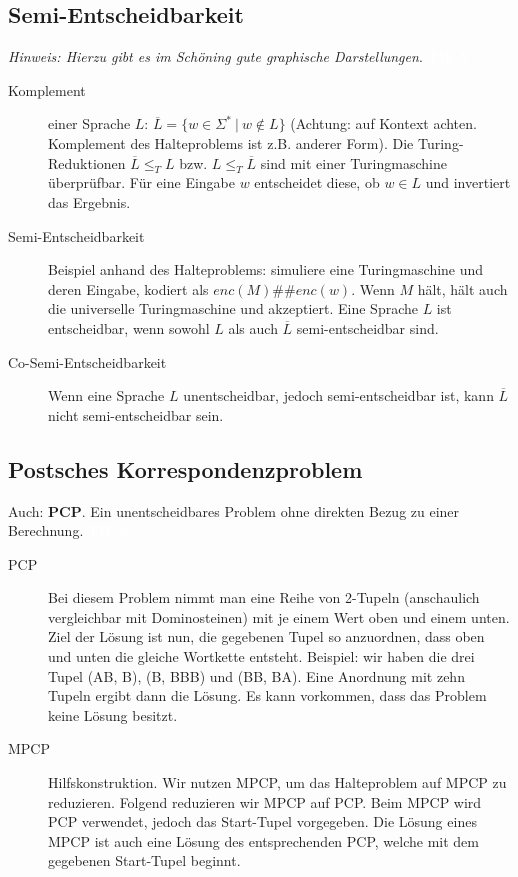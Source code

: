 \documentclass[a4paper,10pt]{article}
\newcommand{\vl}[1]{\colorbox{vl}{\textcolor{white}{\small\textbf{#1}}}}
\newcommand{\f}[1]{\textbf{#1}}
\begin{document}
    \subsection{Semi-Entscheidbarkeit}
    \textit{Hinweis: Hierzu gibt es im Schöning gute graphische Darstellungen}. \vl{TIL 5}
    \begin{description}
        \item[Komplement] einer Sprache $L$: $\overline{L} = \{w \in \Sigma^* ~|~ w \notin L \}$ (Achtung: auf Kontext achten. Komplement des Halteproblems ist z.B. anderer Form). Die Turing-Reduktionen $\overline{L} \leq_T L$ bzw. $L \leq_T \overline{L}$ sind mit einer Turingmaschine überprüfbar. Für eine Eingabe $w$ entscheidet diese, ob $w \in L$ und invertiert das Ergebnis.
        \item[Semi-Entscheidbarkeit] Beispiel anhand des Halteproblems: simuliere eine Turingmaschine und deren Eingabe, kodiert als $enc(M)\#\#enc(w)$. Wenn $M$ hält, hält auch die universelle Turingmaschine und akzeptiert. Eine Sprache $L$ ist entscheidbar, wenn sowohl $L$ als auch $\overline{L}$ semi-entscheidbar sind.
        \item[Co-Semi-Entscheidbarkeit] Wenn eine Sprache $L$ unentscheidbar, jedoch semi-entscheidbar ist, kann $\overline{L}$ nicht semi-entscheidbar sein.
    \end{description}


    \newpage
    \subsection{Postsches Korrespondenzproblem}
    Auch: \f{PCP}. Ein unentscheidbares Problem ohne direkten Bezug zu einer Berechnung. \vl{TIL 5}
    \begin{description}
        \item[PCP] Bei diesem Problem nimmt man eine Reihe von 2-Tupeln (anschaulich vergleichbar mit Dominosteinen) mit je einem Wert oben und einem unten. Ziel der Lösung ist nun, die gegebenen Tupel so anzuordnen, dass oben und unten die gleiche Wortkette entsteht. Beispiel: wir haben die drei Tupel (AB, B), (B, BBB) und (BB, BA). Eine Anordnung mit zehn Tupeln ergibt dann die Lösung. Es kann vorkommen, dass das Problem keine Lösung besitzt.
        \item[MPCP] Hilfskonstruktion. Wir nutzen MPCP, um das Halteproblem auf MPCP zu reduzieren. Folgend reduzieren wir MPCP auf PCP. Beim MPCP wird PCP verwendet, jedoch das Start-Tupel vorgegeben. Die Lösung eines MPCP ist auch eine Lösung des entsprechenden PCP, welche mit dem gegebenen Start-Tupel beginnt.
    \end{description}
\end{document}
